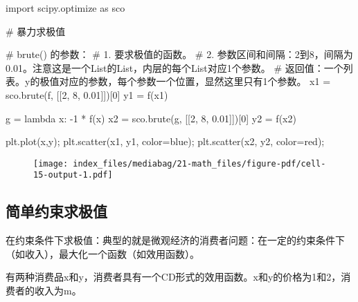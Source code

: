 \documentclass[
  letterpaper,
  DIV=11,
  numbers=noendperiod]{scrreprt}
\newenvironment{Shaded}{\begin{snugshade}}{\end{snugshade}}
\newcommand{\CommentTok}[1]{\textcolor[rgb]{0.37,0.37,0.37}{#1}}
\newcommand{\DecValTok}[1]{\textcolor[rgb]{0.68,0.00,0.00}{#1}}
\newcommand{\FloatTok}[1]{\textcolor[rgb]{0.68,0.00,0.00}{#1}}
\newcommand{\ImportTok}[1]{\textcolor[rgb]{0.00,0.46,0.62}{#1}}
\newcommand{\KeywordTok}[1]{\textcolor[rgb]{0.00,0.23,0.31}{#1}}
\newcommand{\NormalTok}[1]{\textcolor[rgb]{0.00,0.23,0.31}{#1}}
\newcommand{\OperatorTok}[1]{\textcolor[rgb]{0.37,0.37,0.37}{#1}}
\newcommand{\StringTok}[1]{\textcolor[rgb]{0.13,0.47,0.30}{#1}}
\begin{document}
\begin{Shaded}
\begin{Highlighting}[]
\ImportTok{import}\NormalTok{ scipy.optimize }\ImportTok{as}\NormalTok{ sco}

\CommentTok{\# 暴力求极值}

\CommentTok{\# brute() 的参数： }
\CommentTok{\# 1. 要求极值的函数。 }
\CommentTok{\# 2. 参数区间和间隔：2到8，间隔为0.01。注意这是一个List的List，内层的每个List对应1个参数。}
\CommentTok{\# 返回值：一个列表。y的极值对应的参数，每个参数一个位置，显然这里只有1个参数。}
\NormalTok{x1 }\OperatorTok{=}\NormalTok{ sco.brute(f, [[}\DecValTok{2}\NormalTok{, }\DecValTok{8}\NormalTok{, }\FloatTok{0.01}\NormalTok{]])[}\DecValTok{0}\NormalTok{]}
\NormalTok{y1 }\OperatorTok{=}\NormalTok{ f(x1)}


\NormalTok{g }\OperatorTok{=} \KeywordTok{lambda}\NormalTok{ x: }\OperatorTok{{-}}\DecValTok{1} \OperatorTok{*}\NormalTok{ f(x)}
\NormalTok{x2 }\OperatorTok{=}\NormalTok{ sco.brute(g, [[}\DecValTok{2}\NormalTok{, }\DecValTok{8}\NormalTok{, }\FloatTok{0.01}\NormalTok{]])[}\DecValTok{0}\NormalTok{]}
\NormalTok{y2 }\OperatorTok{=}\NormalTok{ f(x2)}

\NormalTok{plt.plot(x,y)}\OperatorTok{;}
\NormalTok{plt.scatter(x1, y1, color}\OperatorTok{=}\StringTok{\textquotesingle{}blue\textquotesingle{}}\NormalTok{)}\OperatorTok{;}
\NormalTok{plt.scatter(x2, y2, color}\OperatorTok{=}\StringTok{\textquotesingle{}red\textquotesingle{}}\NormalTok{)}\OperatorTok{;}
\end{Highlighting}
\end{Shaded}

\begin{figure}[H]

{\centering \texttt{[image: index\_files/mediabag/21-math\_files/figure-pdf/cell-15-output-1.pdf]}

}

\end{figure}

\hypertarget{ux7b80ux5355ux7ea6ux675fux6c42ux6781ux503c}{%
\subsection{简单约束求极值}\label{ux7b80ux5355ux7ea6ux675fux6c42ux6781ux503c}}

在约束条件下求极值：典型的就是微观经济的消费者问题：在一定的约束条件下（如收入），最大化一个函数（如效用函数）。

有两种消费品x和y，消费者具有一个CD形式的效用函数。x和y的价格为1和2，消费者的收入为m。
\end{document}
